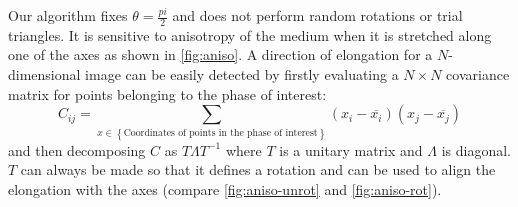 \documentclass[1p]{elsarticle}
\begin{document}
Our algorithm fixes $\theta = \frac{pi}{2}$ and does not perform random
rotations or trial triangles. It is sensitive to anisotropy of the medium
when it is stretched along one of the axes as shown in \cref{fig:aniso}. A
direction of elongation for a $N$-dimensional image can be easily detected by
firstly evaluating a $N \times N$ covariance matrix for points belonging to the
phase of interest:
\begin{equation}
  C_{ij} = \sum_{x \in \left\{ \text{Coordinates of points in the
      phase of interest} \right\}} (x_i - \overline{x_i})(x_j - \overline{x_j})
\end{equation}
and then decomposing $C$ as $T \Lambda T^{-1}$ where $T$ is a unitary matrix and
$\Lambda$ is diagonal. $T$ can always be made so that it defines a rotation and
can be used to align the elongation with the axes (compare \cref{fig:aniso-unrot}
and \cref{fig:aniso-rot}).
\end{document}
